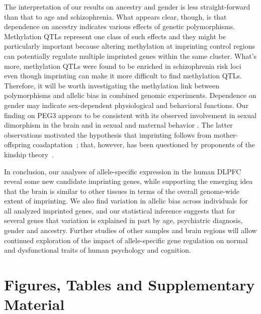 \documentclass[12pt,letterpaper]{article}
\begin{document}
The interpretation of our results on ancestry and gender is less
straight-forward than that to age and schizophrenia.  What appears clear,
though, is that dependence on ancestry indicates various effects of genetic
polymorphisms.   Methylation QTLs represent one class of such effects and they
might be particularly important because altering methylation at imprinting
control regions can potentially regulate multiple imprinted genes within the
same cluster.  What's more, methylation QTLs were found to be enriched in
schizophrenia risk loci~\cite{Hannon2016} even though imprinting can make it
more difficult to find methylation QTLs.  Therefore, it will be worth
investigating the methylation link between polymorphisms and allelic bias in
combined genomic experiments.  Dependence on gender may indicate sex-dependent
physiological and behavioral functions.  Our finding on PEG3 appears to be
consistent with its observed involvement in sexual dimorphism in the brain and
in sexual and maternal behavior \cite{Broad2009}.  The latter observations
motivated the hypothesis that imprinting follows from mother-offspring
coadaptation~\cite{Keverne2015}; that, however, has been questioned by
proponents of the kinship theory~\cite{Haig2014}.

In conclusion, our analyses of allele-specific expression in the human DLPFC
reveal some new candidate imprinting genes, while supporting the emerging idea
that the brain is similar to other tissues in terms of the overall genome-wide
extent of imprinting.  We also find variation in allelic bias
across individuals for all analyzed imprinted genes, and our statistical
inference suggests that for several genes that variation is explained in part
by age, psychiatric diagnosis, gender and ancestry. Further studies
of other samples and brain regions will allow continued exploration of the
impact of allele-specific gene regulation on normal and dysfunctional traits
of human psychology and cognition.




\newpage

\section{Figures, Tables and Supplementary Material}
\end{document}
